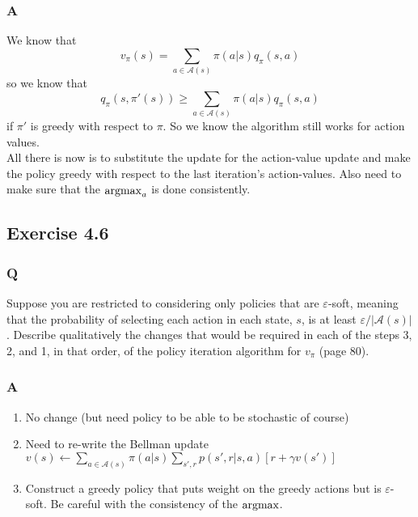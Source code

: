 \subsubsection*{A}
We know that
\begin{equation}
    v_\pi(s) = \sum_{a \in \mathcal{A}(s)} \pi(a|s)q_\pi(s, a)
\end{equation}
so we know that
\begin{equation}
    q_\pi(s, \pi'(s)) \geq \sum_{a \in \mathcal{A}(s)} \pi(a|s)q_\pi(s, a)
\end{equation}
if $\pi'$ is greedy with respect to $\pi$. So we know the algorithm still works for action values.\\

All there is now is to substitute the update for the action-value update and make the policy greedy with respect to the last iteration's action-values. Also need to make sure that the $\operatorname*{argmax}_a$ is done consistently.

\subsection{Exercise 4.6}
\subsubsection*{Q}
Suppose you are restricted to considering only policies that are $\varepsilon$-soft, meaning that the probability of selecting each action in each state, $s$, is at least $\varepsilon / |\mathcal{A}(s)|$. Describe qualitatively the changes that would be required in each of the steps 3, 2, and 1, in that order, of the policy iteration algorithm for $v_\pi$ (page 80).

\subsubsection*{A}
\begin{enumerate}
    \item No change (but need policy to be able to be stochastic of course)
    \item Need to re-write the Bellman update $v(s) \longleftarrow \sum_{a \in \mathcal{A}(s)} \pi(a|s)\sum_{s', r}p(s', r|s, a)\left[ r + \gamma v(s') \right]$
    \item Construct a greedy policy that puts weight on the greedy actions but is $\varepsilon$-soft. Be careful with the consistency of the $\operatorname*{argmax}$.
\end{enumerate}

